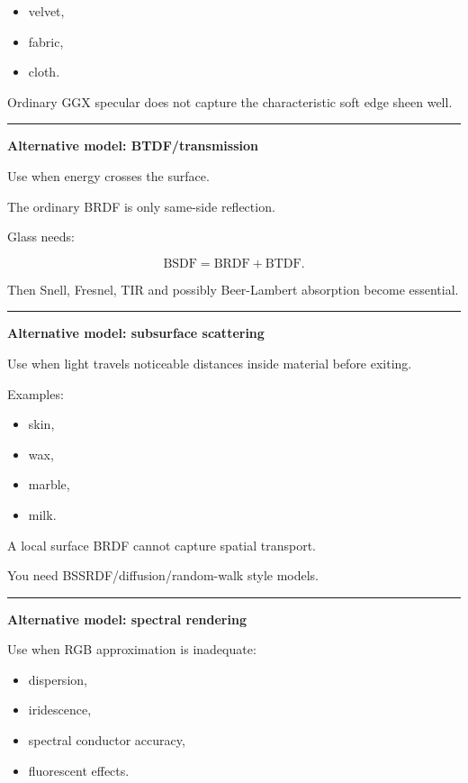 \begin{itemize}
\tightlist
\item
  velvet,
\item
  fabric,
\item
  cloth.
\end{itemize}

Ordinary GGX specular does not capture the characteristic soft edge sheen well.

\begin{center}\rule{0.5\linewidth}{0.5pt}\end{center}

\textbf{Alternative model: BTDF/transmission}

Use when energy crosses the surface.

The ordinary BRDF is only same-side reflection.

Glass needs:

\[
\text{BSDF}
=
\text{BRDF}
+
\text{BTDF}.
\]

Then Snell, Fresnel, TIR and possibly Beer-Lambert absorption become essential.

\begin{center}\rule{0.5\linewidth}{0.5pt}\end{center}

\textbf{Alternative model: subsurface scattering}

Use when light travels noticeable distances inside material before exiting.

Examples:

\begin{itemize}
\tightlist
\item
  skin,
\item
  wax,
\item
  marble,
\item
  milk.
\end{itemize}

A local surface BRDF cannot capture spatial transport.

You need BSSRDF/diffusion/random-walk style models.

\begin{center}\rule{0.5\linewidth}{0.5pt}\end{center}

\textbf{Alternative model: spectral rendering}

Use when RGB approximation is inadequate:

\begin{itemize}
\tightlist
\item
  dispersion,
\item
  iridescence,
\item
  spectral conductor accuracy,
\item
  fluorescent effects.
\end{itemize}

